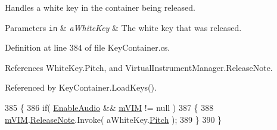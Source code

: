 Handles a white key in the container being released. 


\begin{DoxyParams}[1]{Parameters}
\mbox{\tt in}  & {\em a\+White\+Key} & The white key that was released. \\
\hline
\end{DoxyParams}


Definition at line 384 of file Key\+Container.\+cs.



References White\+Key.\+Pitch, and Virtual\+Instrument\+Manager.\+Release\+Note.



Referenced by Key\+Container.\+Load\+Keys().


\begin{DoxyCode}
385     \{
386         \textcolor{keywordflow}{if}( \hyperlink{group___key_contain_pub_var_ga5dc9b1349f8fafc894c7f739f6780a8c}{EnableAudio} && \hyperlink{group___key_contain_priv_var_ga57ee3824e2f284403bb70ad9c4dfd307}{mVIM} != null )
387         \{
388             \hyperlink{group___key_contain_priv_var_ga57ee3824e2f284403bb70ad9c4dfd307}{mVIM}.\hyperlink{group___v_i_m_events_ga3a1726a6366126421434c2c7be5e5678}{ReleaseNote}.Invoke( aWhiteKey.\hyperlink{group___white_key_pub_var_ga1ddd98b85ba069defc7cf47d25f625f4}{Pitch} );
389         \}
390     \}
\end{DoxyCode}
